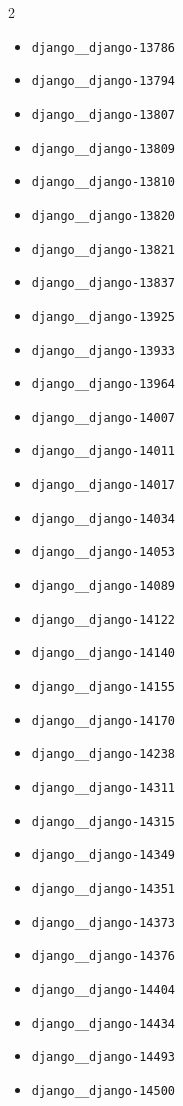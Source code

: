 \documentclass{article} %
\begin{document}
\begin{multicols}{2}
\begin{itemize}
    \item \texttt{django\_\_django-13786}
    \item \texttt{django\_\_django-13794}
    \item \texttt{django\_\_django-13807}
    \item \texttt{django\_\_django-13809}
    \item \texttt{django\_\_django-13810}
    \item \texttt{django\_\_django-13820}
    \item \texttt{django\_\_django-13821}
    \item \texttt{django\_\_django-13837}
    \item \texttt{django\_\_django-13925}
    \item \texttt{django\_\_django-13933}
    \item \texttt{django\_\_django-13964}
    \item \texttt{django\_\_django-14007}
    \item \texttt{django\_\_django-14011}
    \item \texttt{django\_\_django-14017}
    \item \texttt{django\_\_django-14034}
    \item \texttt{django\_\_django-14053}
    \item \texttt{django\_\_django-14089}
    \item \texttt{django\_\_django-14122}
    \item \texttt{django\_\_django-14140}
    \item \texttt{django\_\_django-14155}
    \item \texttt{django\_\_django-14170}
    \item \texttt{django\_\_django-14238}
    \item \texttt{django\_\_django-14311}
    \item \texttt{django\_\_django-14315}
    \item \texttt{django\_\_django-14349}
    \item \texttt{django\_\_django-14351}
    \item \texttt{django\_\_django-14373}
    \item \texttt{django\_\_django-14376}
    \item \texttt{django\_\_django-14404}
    \item \texttt{django\_\_django-14434}
    \item \texttt{django\_\_django-14493}
    \item \texttt{django\_\_django-14500}

\end{itemize}
\end{multicols}
\end{document}
